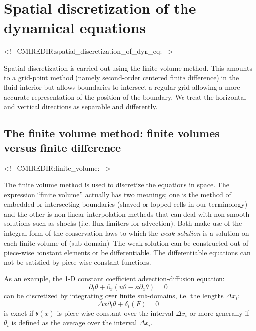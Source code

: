 
\section{Spatial discretization of the dynamical equations}
\begin{rawhtml}
<!-- CMIREDIR:spatial_discretization_of_dyn_eq: -->
\end{rawhtml}

Spatial discretization is carried out using the finite volume
method. This amounts to a grid-point method (namely second-order
centered finite difference) in the fluid interior but allows
boundaries to intersect a regular grid allowing a more accurate
representation of the position of the boundary. We treat the
horizontal and vertical directions as separable and differently.


\subsection{The finite volume method: finite volumes versus finite difference}
\begin{rawhtml}
<!-- CMIREDIR:finite_volume: -->
\end{rawhtml}



The finite volume method is used to discretize the equations in
space. The expression ``finite volume'' actually has two meanings; one
is the method of embedded or intersecting boundaries (shaved or lopped
cells in our terminology) and the other is non-linear interpolation
methods that can deal with non-smooth solutions such as shocks
(i.e. flux limiters for advection). Both make use of the integral form
of the conservation laws to which the {\it weak solution} is a
solution on each finite volume of (sub-domain). The weak solution can
be constructed out of piece-wise constant elements or be
differentiable. The differentiable equations can not be satisfied by
piece-wise constant functions.

As an example, the 1-D constant coefficient advection-diffusion
equation:
\begin{displaymath}
\partial_t \theta + \partial_x ( u \theta - \kappa \partial_x \theta ) = 0
\end{displaymath}
can be discretized by integrating over finite sub-domains, i.e.
the lengths $\Delta x_i$:
\begin{displaymath}
\Delta x \partial_t \theta + \delta_i ( F ) = 0
\end{displaymath}
is exact if $\theta(x)$ is piece-wise constant over the interval
$\Delta x_i$ or more generally if $\theta_i$ is defined as the average
over the interval $\Delta x_i$.

